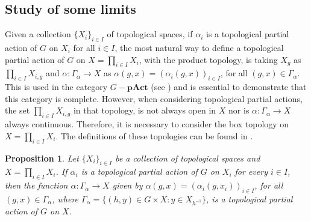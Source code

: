 \documentclass[sn-mathphys-num]{sn-jnl}%
\theoremstyle{thmstyleone}%
\newtheorem{proposition}[theorem]{Proposition}%
\theoremstyle{thmstyletwo}%
\theoremstyle{thmstylethree}%
\begin{document}
\subsection{Study of some limits}
Given  a collection $\{X_i\}_{i \in I} $ of topological spaces, if $\alpha_i$ is a topological partial action of $G$ on $X_i$ for all $i\in I$, the most natural way to define a topological partial action of $G$ on $ X = \prod_{i \in I} X_i $, with the product topology, is taking  $X_g$ as  $\prod_{i \in I} X_{i,g}$ and $ \alpha: \Gamma_{\alpha} \to X $ as  $ \alpha(g,x) = (\alpha_i(g, x))_{i\in I}$, for all   $(g,x)\in \Gamma_{\alpha}$.  This is used in the category $G-\mathbf{pAct}$ (see \cite{Avila1}) and is essential to demonstrate that this category is complete. However, when considering topological partial actions, the set $\prod_{i \in I} X_{i,g}$ in that topology, is not always open in $X$ nor is $ \alpha: \Gamma_{\alpha} \to X $ always continuous. Therefore, it is necessary to consider the box topology on $ X = \prod_{i \in I} X_i $. The definitions of these topologies can be found in \cite{munkres}. \\
\begin{proposition}\label{PartialActionPro}
Let $ \{X_i \}_{i \in I} $ be a collection of topological spaces and $ X = \prod_{i \in I} X_i $. If $ \alpha_i $ is a topological partial  action of $ G $ on $ X_i$ for every $i\in I$, then the function $ \alpha: \Gamma_\alpha \to X $ given by $ \alpha(g, x) = (\alpha_i (g , x_i))_{i \in I} $, for all 
$ (g, x) \in \Gamma_{\alpha}$, where $\Gamma_{\alpha} = \{(h, y) \in G \times X: y \in X_{h^{-1}}\}$, is a topological  partial action of $ G $ on $ X$. 
\end{proposition}
\end{document}
